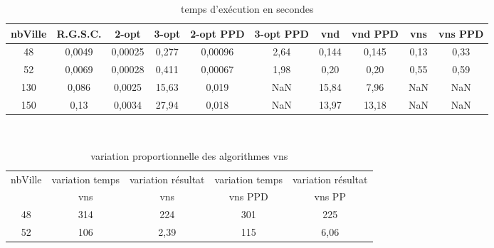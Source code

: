 \documentclass[12pt,a4paper]{article}
\begin{document}
\begin{table}[!h]
\centering
\begin{tabular}{|*{10}{c|}}
  \hline
  nbVille & R.G.S.C. & 2-opt & 3-opt & 2-opt PPD & 3-opt PPD & vnd & vnd PPD & vns & vns PPD \\
  \hline
  48 & 0,0049 & 0,00025 & 0,277 & 0,00096 & 2,64 & 0,144 & 0,145 & 0,13 & 0,33 \\
  52 & 0,0069 & 0,00028 & 0,411 & 0,00067 & 1,98 & 0,20 & 0,20 & 0,55 & 0,59 \\
  130 & 0,086 & 0,0025 & 15,63 & 0,019 & NaN & 15,84 & 7,96 & NaN & NaN \\
  150 & 0,13 & 0,0034 & 27,94 & 0,018 & NaN & 13,97 & 13,18 & NaN & NaN \\
  \hline
\end{tabular}
\caption{temps d’exécution en secondes}
\label{NNHtemps}
\end{table}
~\\
\begin{table}[!h]
\centering
\begin{tabular}{|*{5}{c|}}
  \hline
  nbVille & variation temps & variation résultat & variation temps & variation résultat \\
  ~ & vns & vns & vns PPD & vns PP \\
  \hline
  48 & 314 & 224 & 301 & 225\\ 
  52 & 106 & 2,39 & 115 & 6,06\\
  \hline
\end{tabular}
\caption{variation proportionnelle des algorithmes vns}
\label{variationvnsNNH}
\end{table}
~\\
\end{document}
